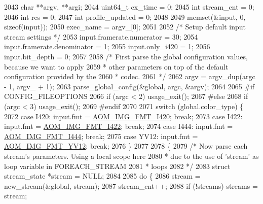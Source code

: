 \begin{DoxyCodeInclude}
{{{{{{{{{{{{{{{{{{{{{{{{{{{{{{{{{{{{{{{{{{{{{{{{{{2043   \textcolor{keywordtype}{char} **argv, **argi;
2044   uint64\_t cx\_time = 0;
2045   \textcolor{keywordtype}{int} stream\_cnt = 0;
2046   \textcolor{keywordtype}{int} res = 0;
2047   \textcolor{keywordtype}{int} profile\_updated = 0;
2048 
2049   memset(&input, 0, \textcolor{keyword}{sizeof}(input));
2050   exec\_name = argv\_[0];
2051 
2052   \textcolor{comment}{/* Setup default input stream settings */}
2053   input.framerate.numerator = 30;
2054   input.framerate.denominator = 1;
2055   input.only\_i420 = 1;
2056   input.bit\_depth = 0;
2057 
2058   \textcolor{comment}{/* First parse the global configuration values, because we want to apply}
2059 \textcolor{comment}{   * other parameters on top of the default configuration provided by the}
2060 \textcolor{comment}{   * codec.}
2061 \textcolor{comment}{   */}
2062   argv = argv\_dup(argc - 1, argv\_ + 1);
2063   parse\_global\_config(&global, argc, &argv);
2064 
2065 \textcolor{preprocessor}{#if CONFIG\_FILEOPTIONS}
2066   \textcolor{keywordflow}{if} (argc < 2) usage\_exit();
2067 \textcolor{preprocessor}{#else}
2068   \textcolor{keywordflow}{if} (argc < 3) usage\_exit();
2069 \textcolor{preprocessor}{#endif}
2070 
2071   \textcolor{keywordflow}{switch} (global.color\_type) \{
2072     \textcolor{keywordflow}{case} I420: input.fmt = \hyperlink{aom__image_8h_a930317c04b4bd0a660bb5e744055523cabd778a3d697463e89d12a1117f417b60}{AOM\_IMG\_FMT\_I420}; \textcolor{keywordflow}{break};
2073     \textcolor{keywordflow}{case} I422: input.fmt = \hyperlink{aom__image_8h_a930317c04b4bd0a660bb5e744055523cab2f75281e94ebc0f0bc728ef287cd3e8}{AOM\_IMG\_FMT\_I422}; \textcolor{keywordflow}{break};
2074     \textcolor{keywordflow}{case} I444: input.fmt = \hyperlink{aom__image_8h_a930317c04b4bd0a660bb5e744055523ca89d423506e948ab7d3b98b5750b92655}{AOM\_IMG\_FMT\_I444}; \textcolor{keywordflow}{break};
2075     \textcolor{keywordflow}{case} YV12: input.fmt = \hyperlink{aom__image_8h_a930317c04b4bd0a660bb5e744055523cad28244100a2754409f285b77a3db90a0}{AOM\_IMG\_FMT\_YV12}; \textcolor{keywordflow}{break};
2076   \}
2077 
2078   \{
2079     \textcolor{comment}{/* Now parse each stream's parameters. Using a local scope here}
2080 \textcolor{comment}{     * due to the use of 'stream' as loop variable in FOREACH\_STREAM}
2081 \textcolor{comment}{     * loops}
2082 \textcolor{comment}{     */}
2083     \textcolor{keyword}{struct }stream\_state *stream = NULL;
2084 
2085     \textcolor{keywordflow}{do} \{
2086       stream = new\_stream(&global, stream);
2087       stream\_cnt++;
2088       \textcolor{keywordflow}{if} (!streams) streams = stream;
}}}}}}}}}}}}}}}}}}}}}}}}}}}}}}}}}}}}}}}}}}}}}}}}}}
\end{DoxyCodeInclude}

